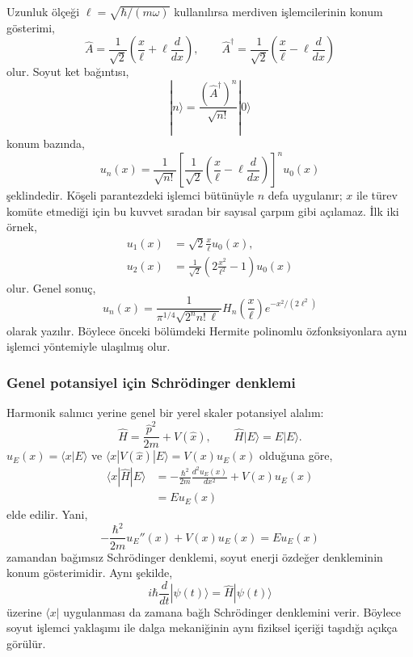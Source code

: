 \documentclass[00_kitap.tex]{subfiles}
\begin{document}
Uzunluk ölçeği $\ell=\sqrt{\hbar/(m\omega)}$ kullanılırsa
merdiven işlemcilerinin konum gösterimi,
\begin{equation}
 \hat A=\frac{1}{\sqrt2}
    \left(\frac{x}{\ell}+\ell\frac{d}{dx}\right),\qquad
 \hat A^\dagger=\frac{1}{\sqrt2}
    \left(\frac{x}{\ell}-\ell\frac{d}{dx}\right)
 \label{eq:06_merdiven_turev}
\end{equation}
olur. Soyut ket bağıntısı,
\begin{equation}
 |n\rangle=\frac{(\hat A^\dagger)^n}{\sqrt{n!}}|0\rangle
\end{equation}
konum bazında,
\begin{equation}
 \boxed{u_n(x)=\frac{1}{\sqrt{n!}}
 \left[\frac{1}{\sqrt2}
       \left(\frac{x}{\ell}-\ell\frac{d}{dx}\right)\right]^n u_0(x)}
 \label{eq:06_ust_df}
\end{equation}
şeklindedir. Köşeli parantezdeki işlemci bütünüyle $n$ defa
uygulanır; $x$ ile türev komüte etmediği için bu kuvvet sıradan bir
sayısal çarpım gibi açılamaz. İlk iki örnek,
\begin{align}
 u_1(x)&=\sqrt2\frac{x}{\ell}u_0(x),\\
 u_2(x)&=\frac{1}{\sqrt2}
           \left(2\frac{x^2}{\ell^2}-1\right)u_0(x)
\end{align}
olur. Genel sonuç,
\begin{equation}
 u_n(x)=\frac{1}{\pi^{1/4}\sqrt{2^n n!\,\ell}}
        H_n\left(\frac{x}{\ell}\right)e^{-x^2/(2\ell^2)}
\end{equation}
olarak yazılır. Böylece önceki bölümdeki Hermite polinomlu
özfonksiyonlara aynı işlemci yöntemiyle ulaşılmış olur.

\subsubsection{Genel potansiyel için Schrödinger denklemi}

Harmonik salınıcı yerine genel bir yerel skaler potansiyel alalım:
\begin{equation}
 \hat H=\frac{\hat p^2}{2m}+V(\hat x),\qquad
 \hat H|E\rangle=E|E\rangle.
\end{equation}
$u_E(x)=\langle x|E\rangle$ ve
$\langle x|V(\hat x)|E\rangle=V(x)u_E(x)$ olduğuna göre,
\begin{align}
 \langle x|\hat H|E\rangle
 &=-\frac{\hbar^2}{2m}\frac{d^2u_E(x)}{dx^2}
   +V(x)u_E(x)\\
 &=E u_E(x)
\end{align}
elde edilir. Yani,
\begin{equation}
 \boxed{-\frac{\hbar^2}{2m}u_E''(x)+V(x)u_E(x)=E u_E(x)}
\end{equation}
zamandan bağımsız Schrödinger denklemi, soyut enerji özdeğer
denkleminin konum gösterimidir. Aynı şekilde,
\begin{equation}
 i\hbar\frac{d}{dt}|\psi(t)\rangle=\hat H|\psi(t)\rangle
\end{equation}
üzerine $\langle x|$ uygulanması da zamana bağlı Schrödinger
denklemini verir. Böylece soyut işlemci yaklaşımı ile dalga
mekaniğinin aynı fiziksel içeriği taşıdığı açıkça görülür.
\end{document}

